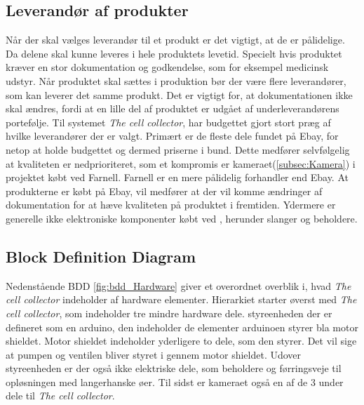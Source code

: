 \subsection{Leverandør af produkter}
Når der skal vælges leverandør til et produkt er det vigtigt, at de er pålidelige. Da delene skal kunne leveres i hele produktets levetid. Specielt hvis produktet kræver en stor dokumentation og godkendelse, som for eksempel medicinsk udstyr. Når produktet skal sættes i produktion bør der være flere leverandører, som kan leverer det samme produkt. Det er vigtigt for, at dokumentationen ikke skal ændres, fordi at en lille del af produktet er udgået af underleverandørens portefølje.
Til systemet \textit{The cell collector}, har budgettet gjort stort præg af hvilke leverandører der er valgt. Primært er de fleste dele fundet på Ebay, for netop at holde budgettet og dermed priserne i bund. Dette medfører selvfølgelig at kvaliteten er nedprioriteret, som et kompromis er kameraet(\ref{subsec:Kamera}) i projektet købt ved Farnell. Farnell er en mere pålidelig forhandler end Ebay. At produkterne er købt på Ebay, vil medfører at der vil komme ændringer af dokumentation for  at hæve kvaliteten på produktet i fremtiden. Ydermere er generelle ikke elektroniske komponenter købt ved \citep{Mikrolab}, herunder slanger og beholdere. 

     


 
 
 
 
 \newpage
\subsection{Block Definition Diagram}  \label{sub:bdd_hardware}
Nedenstående BDD \ref{fig:bdd_Hardware} giver et overordnet overblik i, hvad \textit{The cell collector} indeholder af hardware elementer. Hierarkiet starter øverst med \textit{The cell collector}, som indeholder tre mindre hardware dele. styreenheden der er defineret som en arduino, den indeholder de elementer arduinoen styrer bla motor shieldet. Motor shieldet indeholder yderligere to dele, som den styrer. Det vil sige at pumpen og ventilen bliver styret i gennem motor shieldet. Udover styreenheden er der også ikke elektriske dele, som beholdere og førringsveje til opløsningen med langerhanske øer. Til sidst er kameraet også en af de 3 under dele til \textit{The cell collector}.

